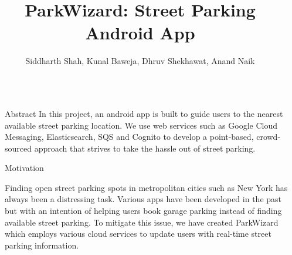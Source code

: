 \documentclass[final]{beamer}
\title{ParkWizard: Street Parking Android App} %
\author{Siddharth Shah, Kunal Baweja, Dhruv Shekhawat, Anand Naik} %
\institute{\mbox{}} %
\newlength{\sepwid}
\newlength{\onecolwid}
\begin{document}


\begin{frame}[t] %

\begin{columns}[t] %

\begin{column}{\sepwid}\end{column} %

\begin{column}{\onecolwid} %


\begin{alertblock}{Abstract}
In this project, an android app is built to guide users to the nearest available street parking location. We use web services such as Google Cloud Messaging, Elasticsearch, SQS and Cognito to develop a point-based, crowd-sourced approach that strives to take the hassle out of street parking.
\end{alertblock}

\begin{block}{Motivation}

Finding open street parking spots in metropolitan cities such as New York has always been a distressing task. Various apps have been developed in the past but with an intention of helping users book garage parking instead of finding available street parking. To mitigate this issue, we have created ParkWizard which employs various cloud services to update users with real-time street parking information.
\end{block}



\end{column}
\end{columns}
\end{frame}
\end{document}
